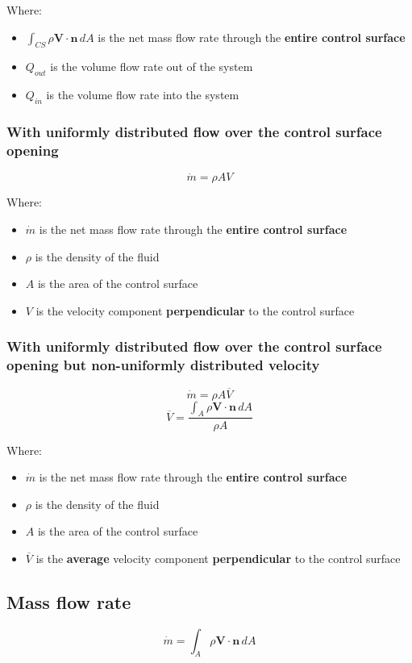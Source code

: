 \documentclass[11pt]{article}
\begin{document}
Where:
\begin{itemize}
\item \(\int_{CS} \rho \boldsymbol{V} \cdot \boldsymbol{n} \, dA\) is the net mass flow rate through the \textbf{entire control surface}
\item \(Q_{out}\) is the volume flow rate out of the system
\item \(Q_{in}\) is the volume flow rate into the system
\end{itemize}

\subsubsection{With uniformly distributed flow over the control surface opening}
\label{sec:orgb0b8f67}
\[\dot{m} = \rho A V\]

Where:
\begin{itemize}
\item \(\dot{m}\) is the net mass flow rate through the \textbf{entire control surface}
\item \(\rho\) is the density of the fluid
\item \(A\) is the area of the control surface
\item \(V\) is the velocity component \textbf{perpendicular} to the control surface
\end{itemize}

\subsubsection{With uniformly distributed flow over the control surface opening but non-uniformly distributed velocity}
\label{sec:org094e66e}
\[\dot{m} = \rho A \overline{V}\]
\[\overline{V} = \frac{\int_A \rho \boldsymbol{V} \cdot \boldsymbol{n} \, dA}{\rho A}\]

Where:
\begin{itemize}
\item \(\dot{m}\) is the net mass flow rate through the \textbf{entire control surface}
\item \(\rho\) is the density of the fluid
\item \(A\) is the area of the control surface
\item \(\overline{V}\) is the \textbf{average} velocity component \textbf{perpendicular} to the control surface
\end{itemize}

\subsection{Mass flow rate}
\label{sec:org05dbb14}
\[\dot{m} = \int_A \rho \boldsymbol{V} \cdot \boldsymbol{n} \, dA\]
\end{document}
